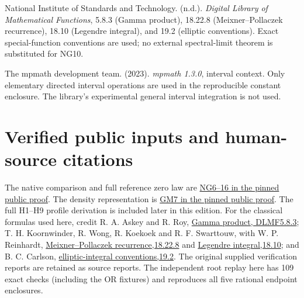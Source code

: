 National Institute of Standards and Technology. (n.d.). \emph{Digital Library of Mathematical Functions}, 5.8.3 (Gamma product), 18.22.8 (Meixner--Pollaczek recurrence), 18.10 (Legendre integral), and 19.2 (elliptic conventions). Exact special-function conventions are used; no external spectral-limit theorem is substituted for NG10.

The mpmath development team. (2023). \emph{mpmath 1.3.0}, interval context. Only elementary directed interval operations are used in the reproducible constant enclosure. The library's experimental general interval integration is not used.

\section*{Verified public inputs and human-source citations}
The native comparison and full reference zero law are
\href{https://github.com/KokunoYumeto/zeta-function-research-reader/blob/5992ad50c0f2a06921f1fcaded7b4e38097c0739/workbenches/splitzero-tandem/continuations/20260920-original-kernel-mixed-determinants/providers/NATIVE_GAUSSIAN_TRANSFER.tex#L101}{NG6--16 in the pinned public proof}.
The density representation is
\href{https://github.com/KokunoYumeto/zeta-function-research-reader/blob/5992ad50c0f2a06921f1fcaded7b4e38097c0739/workbenches/splitzero-tandem/continuations/20260920-original-kernel-mixed-determinants/providers/GAUSSIAN_EQUILIBRIUM_MOMENTS.tex#L80}{GM7 in the pinned public proof}.
The full H1--H9 profile derivation is included later in this edition.
For the classical formulas used here, credit R. A. Askey and R. Roy,
\href{https://dlmf.nist.gov/5.8.E3}{Gamma product, DLMF5.8.3};
T. H. Koornwinder, R. Wong, R. Koekoek and R. F. Swarttouw, with
W. P. Reinhardt,
\href{https://dlmf.nist.gov/18.22.E8}{Meixner--Pollaczek recurrence,18.22.8}
and \href{https://dlmf.nist.gov/18.10}{Legendre integral,18.10};
and B. C. Carlson,
\href{https://dlmf.nist.gov/19.2}{elliptic-integral conventions,19.2}.
The original supplied verification reports are retained as source reports.
The independent root replay here has 109 exact checks (including the OR
fixtures) and reproduces all five rational endpoint enclosures.
